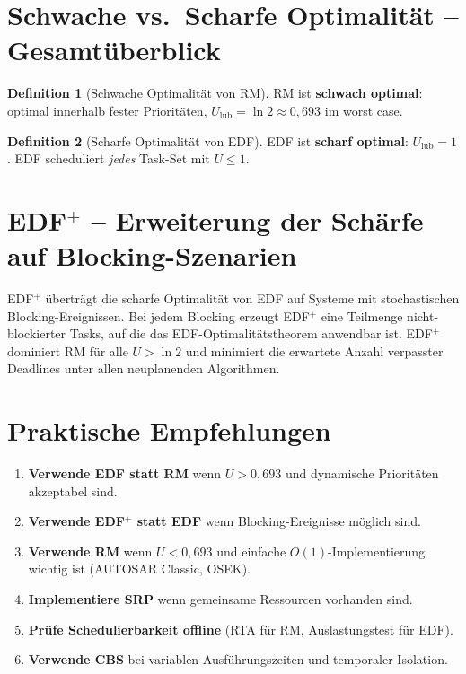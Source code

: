 ﻿\documentclass[a4paper,12pt]{report}
\theoremstyle{definition}
\newtheorem{definition}{Definition}[chapter]
\begin{document}
\section{Schwache vs.\ Scharfe Optimalität -- Gesamtüberblick}

\begin{definition}[Schwache Optimalität von RM]
	RM ist \textbf{schwach optimal}: optimal innerhalb fester Prioritäten,
	$U_{\text{lub}} = \ln 2 \approx 0{,}693$ im worst case.
\end{definition}

\begin{definition}[Scharfe Optimalität von EDF]
	EDF ist \textbf{scharf optimal}: $U_{\text{lub}} = 1$.
	EDF scheduliert \emph{jedes} Task-Set mit $U \leq 1$.
\end{definition}

\section{EDF$^+$ -- Erweiterung der Schärfe auf Blocking-Szenarien}

EDF$^+$ \cite{Epp2026} überträgt die scharfe Optimalität von EDF auf Systeme
mit stochastischen Blocking-Ereignissen. Bei jedem Blocking erzeugt EDF$^+$ eine
Teilmenge nicht-blockierter Tasks, auf die das EDF-Optimalitätstheorem anwendbar ist.
EDF$^+$ dominiert RM für alle $U > \ln 2$ und minimiert die erwartete Anzahl
verpasster Deadlines unter allen neuplanenden Algorithmen.

\section{Praktische Empfehlungen}

\begin{enumerate}
	\item \textbf{Verwende EDF statt RM} wenn $U > 0{,}693$ und dynamische Prioritäten
	      akzeptabel sind.
	\item \textbf{Verwende EDF$^+$ statt EDF} wenn Blocking-Ereignisse möglich sind.
	\item \textbf{Verwende RM} wenn $U < 0{,}693$ und einfache $O(1)$-Implementierung
	      wichtig ist (AUTOSAR Classic, OSEK).
	\item \textbf{Implementiere SRP} wenn gemeinsame Ressourcen vorhanden sind.
	\item \textbf{Prüfe Schedulierbarkeit offline} (RTA für RM, Auslastungstest für EDF).
	\item \textbf{Verwende CBS} bei variablen Ausführungszeiten und temporaler Isolation.
\end{enumerate}
\end{document}
